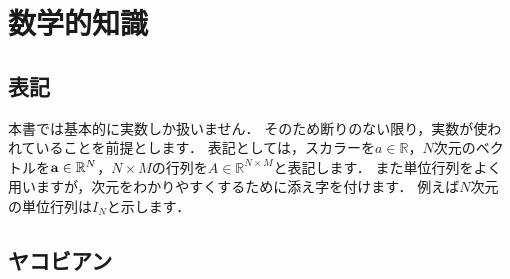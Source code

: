 \chapter{数学的知識}
\label{chap:数学的知識}

\section{表記}

本書では基本的に実数しか扱いません．
そのため断りのない限り，実数が使われていることを前提とします．
表記としては，スカラーを$a \in \mathbb{R}$，$N$次元のベクトルを${\bf a} \in \mathbb{R}^{N}$，$N \times M$の行列を$A \in \mathbb{R}^{N \times M}$と表記します．
また単位行列をよく用いますが，次元をわかりやすくするために添え字を付けます．
例えば$N$次元の単位行列は$I_{N}$と示します．













\section{ヤコビアン}


